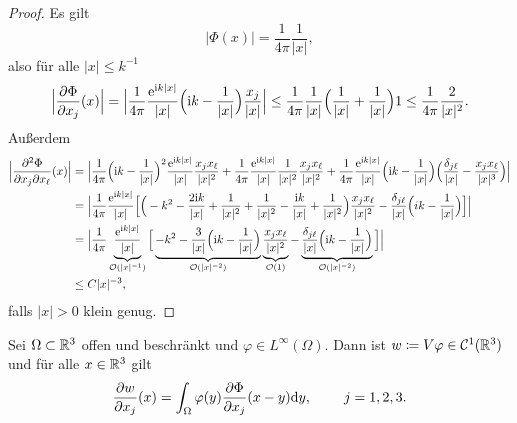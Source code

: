 \begin{proof}
	Es gilt
	\begin{equation*}
		|\Phi(x)|=\frac{1}{4\pi}\frac{1}{|x|},
	\end{equation*}
	also für alle \(|x|\leq k^{-1}\)
	\begin{equation*}
		\Big|\frac{\partial\Phi}{\partial x_j}(x)\Big|=\Big|\frac{1}{4\pi}\frac{\mathrm{e}^{\mathrm{i} k|x|}}{|x|}\Big(\mathrm{i} k-\frac{1}{|x|}\Big)\frac{x_j}{|x|}\Big|\leq\frac{1}{4\pi}\frac{1}{|x|}\Big(\frac{1}{|x|}+\frac{1}{|x|}\Big)1\leq\frac{1}{4\pi}\frac{2}{|x|^2}.
	\end{equation*}
	Außerdem
	\begin{align*}
		\Big|\frac{\partial^2\Phi}{\partial x_j\partial x_\ell}(x)\Big|
		&=\Big|\frac{1}{4\pi}\Big(\mathrm{i} k-\frac{1}{|x|}\Big)^2\frac{\mathrm{e}^{\mathrm{i} k|x|}}{|x|}\frac{x_jx_\ell}{|x|^2}
		+\frac{1}{4\pi}\frac{\mathrm{e}^{\mathrm{i} k|x|}}{|x|}\frac{1}{|x|^2}\frac{x_jx_\ell}{|x|^2}
		+\frac{1}{4\pi}\frac{\mathrm{e}^{\mathrm{i} k|x|}}{|x|}\Big(\mathrm{i} k-\frac{1}{|x|}\Big)\Big(\frac{\delta_{j\ell}}{|x|}-\frac{x_jx_\ell}{|x|^3}\Big)\Big|\\
		&=\Big|\frac{1}{4\pi}\frac{\mathrm{e}^{\mathrm{i} k|x|}}{|x|}\Big[\Big(-k^2-\frac{2\mathrm{i} k}{|x|}+\frac{1}{|x|^2}+\frac{1}{|x|^2}-\frac{\mathrm{i} k}{|x|}+\frac{1}{|x|^2}\Big)\frac{x_jx_\ell}{|x|^2}
		-\frac{\delta_{j\ell}}{|x|}\Big(ik-\frac{1}{|x|}\Big)\Big]\Big|\\
		&=\Big|\frac{1}{4\pi}\underbrace{\frac{\mathrm{e}^{\mathrm{i} k|x|}}{|x|}}_{\mathcal{O}(|x|^{-1})}
		\Big[\underbrace{-k^2-\frac{3}{|x|}\Big(\mathrm{i} k-\frac{1}{|x|}\Big)}_{\mathcal{O}(|x|^{-2})}
		\underbrace{\frac{x_jx_\ell}{|x|^2}}_{\mathcal{O}(1)}
		-\underbrace{\frac{\delta_{j\ell}}{|x|}\Big(\mathrm{i} k-\frac{1}{|x|}\Big)}_{\mathcal{O}(|x|^{-2})}
		\Big]\Big|\\
		&\leq C|x|^{-3},
	\end{align*}
	falls \(|x|>0\) klein genug.
\end{proof}
\begin{lem}\label{lem: volumenpotential + fundamentallösung}
	Sei \(\Omega\subset\mathbb{R}^3\) offen und beschränkt und \(\varphi\in L^\infty(\Omega)\). Dann ist \(w\coloneqq V\varphi\in\mathcal{C}^1(\mathbb{R}^3)\) und für alle \(x\in\mathbb{R}^3\) gilt
	\begin{equation}
		\label{lemma volumenpotential und fundamentallösung}
		\frac{\partial w}{\partial x_j}(x)=\int_\Omega\varphi(y)\frac{\partial\Phi}{\partial x_j}(x-y)\mathrm{d}y,\;\qquad j=1,2,3.
	\end{equation}
\end{lem}
